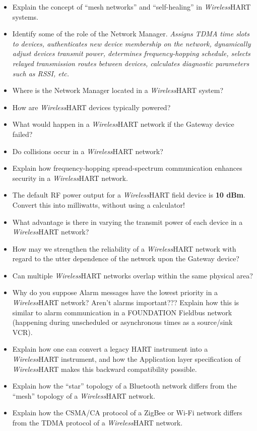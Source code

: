 \begin{itemize}
\item{} Explain the concept of ``mesh networks'' and ``self-healing'' in {\sl Wireless}HART systems.
\item{} Identify some of the role of the Network Manager.  {\it Assigns TDMA time slots to devices, authenticates new device membership on the network, dynamically adjust devices transmit power, determines frequency-hopping schedule, selects relayed transmission routes between devices, calculates diagnostic parameters such as RSSI, etc.}
\item{} Where is the Network Manager located in a {\sl Wireless}HART system?
\item{} How are {\sl Wireless}HART devices typically powered?
\item{} What would happen in a {\sl Wireless}HART network if the Gateway device failed?
\item{} Do collisions occur in a {\sl Wireless}HART network?
\item{} Explain how frequency-hopping spread-spectrum communication enhances security in a {\sl Wireless}HART network.
\item{} The default RF power output for a {\sl Wireless}HART field device is {\bf 10 dBm}.  Convert this into milliwatts, without using a calculator!
\item{} What advantage is there in varying the transmit power of each device in a {\sl Wireless}HART network?
\item{} How may we strengthen the reliability of a {\sl Wireless}HART network with regard to the utter dependence of the network upon the Gateway device?
\item{} Can multiple {\sl Wireless}HART networks overlap within the same physical area?
\item{} Why do you suppose Alarm messages have the lowest priority in a {\sl Wireless}HART network?  Aren't alarms important???  Explain how this is similar to alarm communication in a FOUNDATION Fieldbus network (happening during unscheduled or asynchronous times as a source/sink VCR).
\item{} Explain how one can convert a legacy HART instrument into a {\sl Wireless}HART instrument, and how the Application layer specification of {\sl Wireless}HART makes this backward compatibility possible.
\item{} Explain how the ``star'' topology of a Bluetooth network differs from the ``mesh'' topology of a {\sl Wireless}HART network.
\item{} Explain how the CSMA/CA protocol of a ZigBee or Wi-Fi network differs from the TDMA protocol of a {\sl Wireless}HART network.

\end{itemize}
